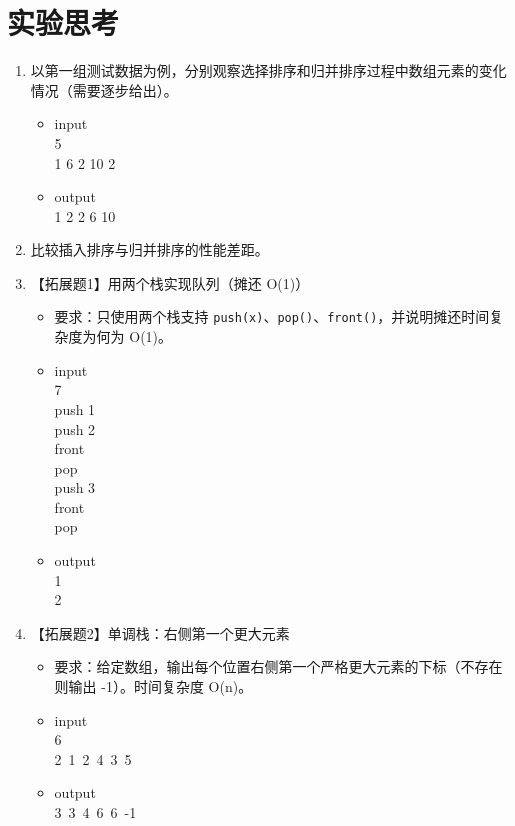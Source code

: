 \documentclass{article}
\begin{document}
\section{实验思考}
\begin{enumerate}
    \item 以第一组测试数据为例，分别观察选择排序和归并排序过程中数组元素的变化情况（需要逐步给出）。
    \begin{itemize}
        \item input \\ 5 \\ 1 6 2 10 2
        \item output \\ 1 2 2 6 10
    \end{itemize}
    
    \item 比较插入排序与归并排序的性能差距。

    \item 【拓展题1】用两个栈实现队列（摊还 O(1)）
    \begin{itemize}
        \item 要求：只使用两个栈支持 \texttt{push(x)}、\texttt{pop()}、\texttt{front()}，并说明摊还时间复杂度为何为 O(1)。
        \item input \\
        7 \\
        push 1 \\
        push 2 \\
        front \\
        pop \\
        push 3 \\
        front \\
        pop
        \item output \\
        1 \\
        2
    \end{itemize}

    \item 【拓展题2】单调栈：右侧第一个更大元素
    \begin{itemize}
        \item 要求：给定数组，输出每个位置右侧第一个严格更大元素的下标（不存在则输出 -1）。时间复杂度 O(n)。
        \item input \\
        6 \\
        2\ 1\ 2\ 4\ 3\ 5
        \item output \\
        3\ 3\ 4\ 6\ 6\ -1
    \end{itemize}


    
\end{enumerate}
\end{document}

